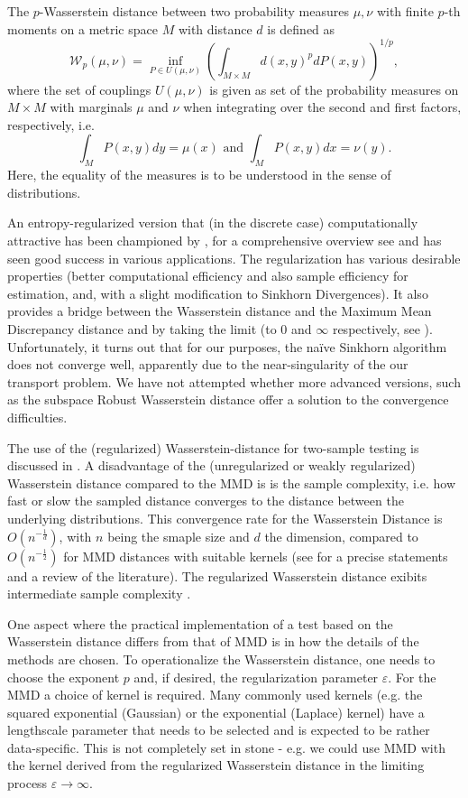 \documentclass[a4paper,twoside,10pt]{article}
\theoremstyle{plain}
\theoremstyle{remark}
\begin{document}
The $p$-Wasserstein distance between two probability measures $\mu, \nu$ with finite $p$-th moments on a metric space $M$ with distance $d$ is defined as
\[
  \mathcal{W}_p(\mu, \nu) = \inf_{P \in U(\mu, \nu)} \left( \int_{M \times M} d(x, y)^p dP(x,y) \right)^{1/p},
\]
where the set of couplings $U(\mu, \nu)$ is given as set of the probability measures on $M \times M$ with marginals $\mu$ and $\nu$ when integrating
over the second and first factors, respectively, i.e.
\[
  \int_{M} P(x,y) dy = \mu(x) \text{ and } \int_{M} P(x,y) dx = \nu(y).
\]
Here, the equality of the measures is to be understood in the sense of distributions.

An entropy-regularized version that (in the discrete case) computationally attractive has been championed by \cite{Cuturi}, for a comprehensive overview see \cite{PeyreCuturi} and has seen good success in various applications. The regularization has various desirable properties (better computational efficiency and also sample efficiency for estimation, and, with a slight modification to Sinkhorn Divergences).
It also provides a bridge between the Wasserstein distance and the Maximum Mean Discrepancy distance and by taking the limit (to $0$ and $\infty$ respectively, see \cite{Genevay}). Unfortunately, it turns out that
for our purposes, the na\"ive Sinkhorn algorithm does not converge well, apparently due to the near-singularity of the our transport problem. We have not attempted whether more advanced versions, such as the subspace Robust Wasserstein distance \cite{SRW} offer a solution to the convergence difficulties.

The use of the (regularized) Wasserstein-distance for two-sample testing is discussed in \cite{Ramdas}. A disadvantage of the (unregularized or weakly regularized) Wasserstein distance compared to the MMD is is the sample complexity, i.e. how fast or slow the sampled distance converges to the distance between the underlying distributions. This convergence rate for the Wasserstein Distance is $O(n^{-\frac{1}{d}})$, with $n$ being the smaple size and $d$ the dimension, compared to $O(n^{-\frac{1}{2}})$ for MMD distances with suitable kernels (see \cite{PeyreCuturi} for a precise statements and a review of the literature). The regularized Wasserstein distance exibits intermediate sample complexity  \cite{Genevay}.

One aspect where the practical implementation of a test based on the Wasserstein distance differs from that of MMD is in how the details of the methods are chosen.
To operationalize the Wasserstein distance, one needs to choose the exponent $p$ and, if desired, the regularization parameter $\varepsilon$. For the MMD a choice of kernel is required. Many commonly used kernels (e.g. the squared exponential (Gaussian) or the exponential (Laplace) kernel) have a lengthscale parameter that needs to be selected and is expected to be rather data-specific.
This is not completely set in stone - e.g. we could use MMD with the kernel derived from the regularized Wasserstein distance in the limiting process $\varepsilon \rightarrow \infty$.
\end{document}

